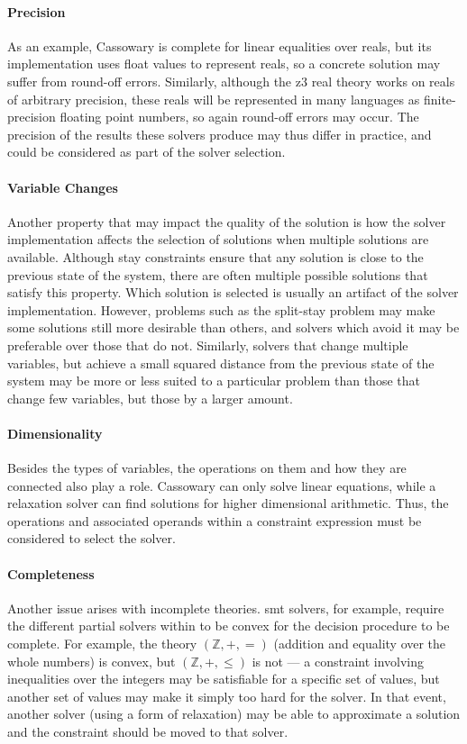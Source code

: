 \paragraph*{Precision} As an example, Cassowary is complete for linear
equalities over reals, but its implementation uses float values to
represent reals, so a concrete solution may suffer from round-off
errors. Similarly, although the \gls{z3} real theory works on reals of
arbitrary precision, these reals will be represented in many languages
as finite-precision floating point numbers, so again round-off errors
may occur. The precision of the results these solvers produce may thus
differ in practice, and could be considered as part of the solver
selection.

\paragraph*{Variable Changes} Another property that may impact the
quality of the solution is how the solver implementation affects the
selection of solutions when multiple solutions are available. Although
stay constraints ensure that any solution is close to the previous
state of the system, there are often multiple possible solutions that
satisfy this property. Which solution is selected is usually an
artifact of the solver implementation. However, problems such as the
split-stay problem may make some solutions still more desirable than
others, and solvers which avoid it may be preferable over those that
do not. Similarly, solvers that change multiple variables, but achieve
a small squared distance from the previous state of the system may be
more or less suited to a particular problem than those that change few
variables, but those by a larger amount.

\paragraph*{Dimensionality} Besides the types of variables, the
operations on them and how they are connected also play a
role. Cassowary can only solve linear equations, while a relaxation
solver can find solutions for higher dimensional arithmetic. Thus, the
operations and associated operands within a constraint expression must
be considered to select the solver.

\paragraph*{Completeness} Another issue arises with incomplete
theories. \gls{smt} solvers, for example, require the different
partial solvers within to be convex for the decision procedure to be
complete. For example, the theory $(\mathbb{Z},+,=)$ (addition and
equality over the whole numbers) is convex, but $(\mathbb{Z},+,\leq)$
is not --- a constraint involving inequalities over the integers may
be satisfiable for a specific set of values, but another set of values
may make it simply too hard for the solver. In that event, another
solver (\eg using a form of relaxation) may be able to approximate a
solution and the constraint should be moved to that solver.

